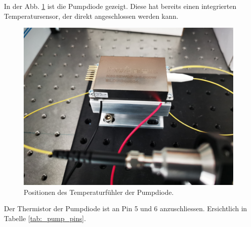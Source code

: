 In der Abb. \ref{fig:temp_measurement_hw_1} ist die Pumpdiode gezeigt. Diese hat bereits einen integrierten Temperatursensor, der direkt angeschlossen werden kann.

\begin{figure}[H]
    \centering
    \includegraphics[scale=0.08, trim={300mm 300mm 200mm 150mm}, clip]{98_images/IMG_20240322_111841.jpg}
    \caption{Positionen des Temperaturfühler der Pumpdiode.}
    \label{fig:temp_measurement_hw_1}
\end{figure}

Der Thermistor der Pumpdiode ist an Pin 5 und 6 anzuschliessen. Ersichtlich in Tabelle \ref{tab:_pump_pins}.

